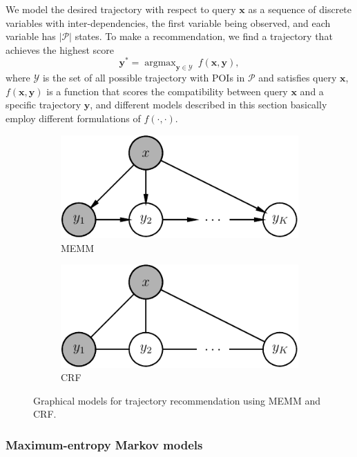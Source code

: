 \documentclass[9pt]{extarticle}
\DeclareMathOperator*{\argmax}{argmax}
\begin{document}
We model the desired trajectory with respect to query $\mathbf{x}$ as a sequence of discrete variables with inter-dependencies,
the first variable being observed, and each variable has $|\mathcal{P}|$ states.
To make a recommendation, we find a trajectory that achieves the highest score
\begin{equation*}
\mathbf{y}^* = \argmax_{\mathbf{y} \in \mathcal{Y}}~ f(\mathbf{x}, \mathbf{y}),
\end{equation*}
where $\mathcal{Y}$ is the set of all possible trajectory with POIs in $\mathcal{P}$ and satisfies query $\mathbf{x}$,
$f(\mathbf{x}, \mathbf{y})$ is a function that scores the compatibility between query $\mathbf{x}$ and a specific trajectory $\mathbf{y}$,
and different models described in this section basically employ different formulations of $f(\cdot,\cdot)$. %


\begin{figure}
    \centering
    \begin{subfigure}[t]{.49\textwidth} %
        \centering
        \includegraphics[width=.6\textwidth]{memm.pdf} %
        \caption{MEMM}
    \end{subfigure}
    \begin{subfigure}[t]{.49\textwidth}
        \centering
        \includegraphics[width=.6\textwidth]{crf.pdf}
        \caption{CRF}
    \end{subfigure}
    \caption{Graphical models for trajectory recommendation using MEMM and CRF.}
    \label{fig:pgm}
\end{figure}


\subsubsection{Maximum-entropy Markov models}
\label{sec:memm}
\end{document}
